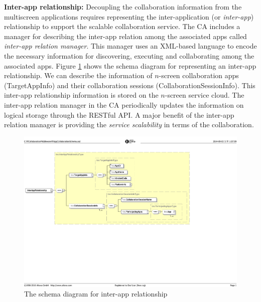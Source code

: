 \documentclass[conference]{IEEEtran}
\begin{document}
\noindent
\textbf{Inter-app relationship:}
Decoupling the collaboration information from the multiscreen applications requires representing the inter-application (or \textit{inter-app}) relationship to support the scalable collaboration service. The CA includes a manager for describing the inter-app relation among the associated apps called \textit{inter-app relation manager}. This manager uses an XML-based language to encode the necessary information for discovering, executing and collaborating among the associated apps. 
Figure \ref{fig:interapprelation} shows the schema diagram for representing an inter-app relationship. We can describe the information of $n$-screen collaboration apps (TargetAppInfo) and their collaboration sessions (CollaborationSessionInfo).
This inter-app relationship information is stored on the $n$-screen service cloud. The inter-app relation manager in the CA periodically updates the information on logical storage through the RESTful API.
A major benefit of the inter-app relation manager is providing the \textit{service scalability} in terms of the collaboration.


\begin{figure}[htb] %
\centering
\includegraphics[width=13cm,keepaspectratio]{interapprelation}
\caption{The schema diagram for inter-app relationship}
\label{fig:interapprelation}
\end{figure}
\end{document}
